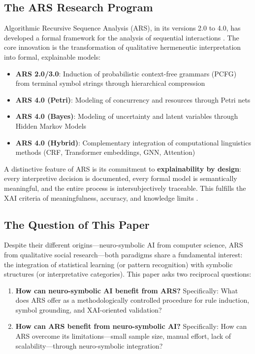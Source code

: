 \documentclass[12pt,a4paper]{article}
\begin{document}
\subsection{The ARS Research Program}

Algorithmic Recursive Sequence Analysis (ARS), in its versions 2.0 to 4.0, has 
developed a formal framework for the analysis of sequential interactions 
\citep{koop2024ars}. The core innovation is the transformation of qualitative 
hermeneutic interpretation into formal, explainable models:

\begin{itemize}
    \item \textbf{ARS 2.0/3.0}: Induction of probabilistic context-free grammars 
    (PCFG) from terminal symbol strings through hierarchical compression
    \item \textbf{ARS 4.0 (Petri)}: Modeling of concurrency and resources through 
    Petri nets
    \item \textbf{ARS 4.0 (Bayes)}: Modeling of uncertainty and latent variables 
    through Hidden Markov Models
    \item \textbf{ARS 4.0 (Hybrid)}: Complementary integration of computational 
    linguistics methods (CRF, Transformer embeddings, GNN, Attention)
\end{itemize}

A distinctive feature of ARS is its commitment to \textbf{explainability by 
design}: every interpretive decision is documented, every formal model is 
semantically meaningful, and the entire process is intersubjectively traceable. 
This fulfills the XAI criteria of meaningfulness, accuracy, and knowledge limits 
\citep{ortigossa2024xai}.

\subsection{The Question of This Paper}

Despite their different origins—neuro-symbolic AI from computer science, ARS 
from qualitative social research—both paradigms share a fundamental interest: 
the integration of statistical learning (or pattern recognition) with symbolic 
structures (or interpretative categories). This paper asks two reciprocal questions:

\begin{enumerate}
    \item \textbf{How can neuro-symbolic AI benefit from ARS?} Specifically: 
    What does ARS offer as a methodologically controlled procedure for rule 
    induction, symbol grounding, and XAI-oriented validation?
    
    \item \textbf{How can ARS benefit from neuro-symbolic AI?} Specifically: 
    How can ARS overcome its limitations—small sample size, manual effort, 
    lack of scalability—through neuro-symbolic integration?
\end{enumerate}
\end{document}
